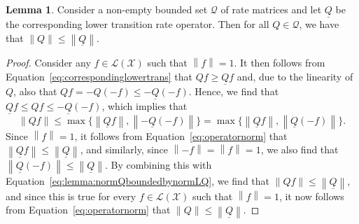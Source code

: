 \documentclass[10pt,a4paper]{paper}
\theoremstyle{definition}
\newtheorem{lemma}[theorem]{Lemma}
\newcommand{\states}{\mathcal{X}}
\newcommand{\gambles}{\mathcal{L}}
\newcommand{\gamblesX}{\gambles(\states)}
\newcommand{\rateset}{\mathcal{Q}}
\newcommand{\lrate}{\underline{Q}}
\newcommand{\norm}[1]{\left\lVert #1 \right\rVert}
\begin{document}
\begin{lemma}\label{lemma:normQboundedbynormLQ}
Consider a non-empty bounded set $\rateset$ of rate matrices and let $\lrate$ be the corresponding lower transition rate operator. Then for all $Q\in\rateset$, we have that $\norm{Q}\leq\norm{\lrate}$.
\end{lemma}
\begin{proof}
Consider any $f\in\gamblesX$ such that $\norm{f}=1$. It then follows from Equation~\eqref{eq:correspondinglowertrans} that $Qf\geq\lrate f$ and, due to the linearity of $Q$, also that $Qf=-Q(-f)\leq-\lrate(-f)$. Hence, we find that $\lrate f\leq Q f\leq-\lrate(-f)$, which implies that
\begin{equation}\label{eq:lemma:normQboundedbynormLQ}
\norm{Qf}\leq\max\{\norm{\lrate f},\norm{-\lrate(-f)}\}=\max\{\norm{\lrate f},\norm{\lrate(-f)}\}.
\end{equation}
Since $\norm{f}=1$, it follows from Equation~\eqref{eq:operatornorm} that $\norm{\lrate f}\leq\norm{\lrate}$, and similarly, since $\norm{-f}=\norm{f}=1$, we also find that $\norm{\lrate(-f)}\leq\norm{\lrate}$. By combining this with Equation~\eqref{eq:lemma:normQboundedbynormLQ}, we find that $\norm{Qf}\leq\norm{\lrate}$, and since this is true for every $f\in\gamblesX$ such that $\norm{f}=1$, it now follows from Equation~\eqref{eq:operatornorm} that $\norm{Q}\leq\norm{\lrate}$.
\end{proof}
\end{document}
